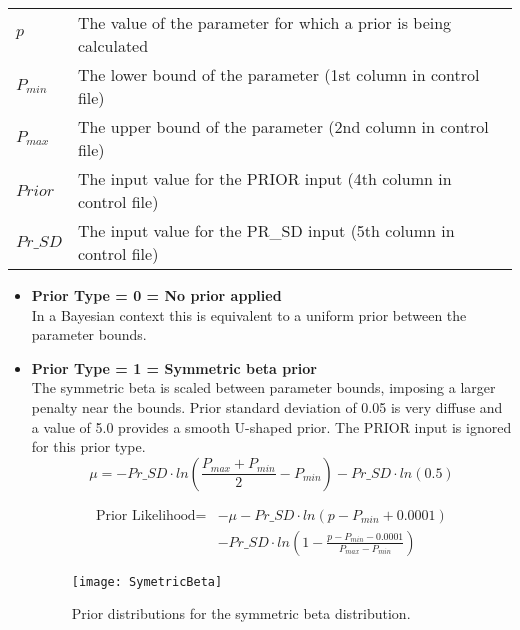 \begin{tabular}{ll}
	$p$       & The value of the parameter for which a prior is being calculated  \\
	$P_{min}$  & The lower bound of the parameter (1st column in control file)     \\
	$P_{max}$  & The upper bound of the parameter (2nd column in control file)     \\
	$Prior$   & The input value for the PRIOR input (4th column in control file)  \\
	$Pr\_SD$  & The input value for the PR\_SD input (5th column in control file) \\
\end{tabular}

\begin{itemize}
	\item  \textbf{Prior Type = 0 = No prior applied} \\ 
	In a Bayesian context this is equivalent to a uniform prior between the parameter bounds.
	
	\item  \textbf{Prior Type = 1 = Symmetric beta prior} \\ 
	The symmetric beta is scaled between parameter bounds, imposing a larger penalty near the bounds.  Prior standard deviation of 0.05 is very diffuse and a value of 5.0 provides a smooth U-shaped prior. The PRIOR input is ignored for this prior type.
	\begin{equation}  
		\mu = -Pr\_SD \cdot ln\left(\frac{P_{max}+P_{min}}{2} - P_{min} \right) - Pr\_SD \cdot ln(0.5)
	\end{equation}
	
	\begin{equation}
		\begin{split}
			\text{Prior Likelihood} = & -\mu - Pr\_SD \cdot ln\left(p-P_{min}+0.0001\right) \\
			& - Pr\_SD \cdot ln\left(1-\frac{p-P_{min}-0.0001}{P_{max}-P_{min}}\right)
		\end{split}
	\end{equation}

	\begin{figure}[h]
	\begin{center}
		\texttt{[image: SymetricBeta]}\\
	\end{center}
	\caption{Prior distributions for the symmetric beta distribution.}
	\end{figure}	


\end{itemize}
